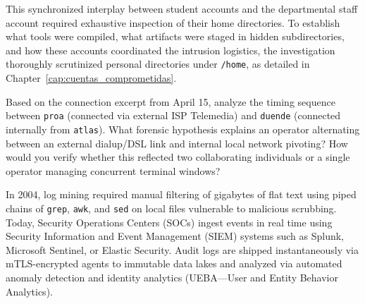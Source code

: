 This synchronized interplay between student accounts and the departmental staff account required exhaustive inspection of their home directories. To establish what tools were compiled, what artifacts were staged in hidden subdirectories, and how these accounts coordinated the intrusion logistics, the investigation thoroughly scrutinized personal directories under \texttt{/home}, as detailed in Chapter~\ref{cap:cuentas_comprometidas}.

\begin{retoforense}
Based on the connection excerpt from April 15, analyze the timing sequence between \texttt{proa} (connected via external ISP Telemedia) and \texttt{duende} (connected internally from \texttt{atlas}). What forensic hypothesis explains an operator alternating between an external dialup/DSL link and internal local network pivoting? How would you verify whether this reflected two collaborating individuals or a single operator managing concurrent terminal windows?
\end{retoforense}

\begin{perspectiva20}
In 2004, log mining required manual filtering of gigabytes of flat text using piped chains of \texttt{grep}, \texttt{awk}, and \texttt{sed} on local files vulnerable to malicious scrubbing. Today, Security Operations Centers (SOCs) ingest events in real time using Security Information and Event Management (SIEM) systems such as Splunk, Microsoft Sentinel, or Elastic Security. Audit logs are shipped instantaneously via mTLS-encrypted agents to immutable data lakes and analyzed via automated anomaly detection and identity analytics (UEBA---User and Entity Behavior Analytics).
\end{perspectiva20}

